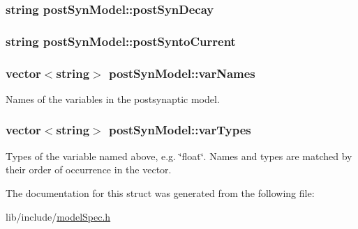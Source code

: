 \hypertarget{structpostSynModel_a6fe67c6dc9d43b39e17930e61cbffeb0}{
\subsubsection[{post\+Syn\+Decay}]{\setlength{\rightskip}{0pt plus 5cm}string post\+Syn\+Model\+::post\+Syn\+Decay}}\label{structpostSynModel_a6fe67c6dc9d43b39e17930e61cbffeb0}
\hypertarget{structpostSynModel_a205249bc6ac27c021d3395a9cad6a81b}{
\subsubsection[{post\+Synto\+Current}]{\setlength{\rightskip}{0pt plus 5cm}string post\+Syn\+Model\+::post\+Synto\+Current}}\label{structpostSynModel_a205249bc6ac27c021d3395a9cad6a81b}
\hypertarget{structpostSynModel_a3ade04dd55a74c018cb3c3c16a0c4a47}{
\subsubsection[{var\+Names}]{\setlength{\rightskip}{0pt plus 5cm}vector$<$string$>$ post\+Syn\+Model\+::var\+Names}}\label{structpostSynModel_a3ade04dd55a74c018cb3c3c16a0c4a47}


Names of the variables in the postsynaptic model. 

\hypertarget{structpostSynModel_a5afb775c8211cb7591bb3c50526267fc}{
\subsubsection[{var\+Types}]{\setlength{\rightskip}{0pt plus 5cm}vector$<$string$>$ post\+Syn\+Model\+::var\+Types}}\label{structpostSynModel_a5afb775c8211cb7591bb3c50526267fc}


Types of the variable named above, e.\+g. \char`\"{}float\char`\"{}. Names and types are matched by their order of occurrence in the vector. 



The documentation for this struct was generated from the following file\+:\begin{DoxyCompactItemize}
\item 
lib/include/\hyperlink{modelSpec_8h}{model\+Spec.\+h}\end{DoxyCompactItemize}
